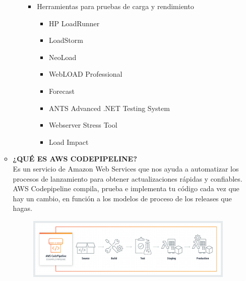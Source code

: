 \documentclass[12pt,a4paper,oneside]{book}
\begin{document}
\begin{enumerate}
\begin{itemize}
\begin{enumerate}
\begin{itemize}
\begin{itemize}
									\end{itemize}
								\item Herramientas para pruebas de carga y rendimiento 
									\begin{itemize}
										\item HP LoadRunner
										\item LoadStorm
										\item NeoLoad
										\item WebLOAD Professional
										\item Forecast
										\item ANTS Advanced .NET Testing System
										\item Webserver Stress Tool
										\item Load Impact
										
									\end{itemize}
							\end{itemize}
					\end{enumerate}
					
				\item \textbf{¿QUÉ ES AWS CODEPIPELINE?}\\
					Es un servicio de Amazon Web Services que nos ayuda a automatizar los procesos de lanzamiento para obtener actualizaciones rápidas y confiables. AWS Codepipeline compila, prueba e implementa tu código cada vez que hay un cambio, en función a los modelos de proceso de los releases que hagas.\\
					
			\newpage			
						\begin{center}
							\begin{figure}[htb]
								\centering \includegraphics[width=10cm, height=3cm]{img/code.png}
							\end{figure}
						\end{center}
						

\end{itemize}
\end{enumerate}
\end{document}
